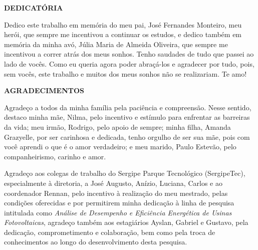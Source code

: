\cleardoublepage
\thispagestyle{empty}

\begin{center}

\textbf{DEDICATÓRIA}
    
\end{center}



\vspace*{\fill}

\hspace*{7cm}
\begin{minipage}{\dimexpr\textwidth-8.2cm\relax}
Dedico este trabalho em memória do meu pai, José Fernandes Monteiro, meu herói, que sempre me incentivou a continuar os estudos,
 e dedico também em memória da minha avó, Júlia Maria de Almeida Oliveira, que sempre me incentivou a correr atrás dos meus sonhos. Tenho saudades de tudo que passei ao lado de vocês. Como eu queria agora poder abraçá-los e agradecer por tudo, pois, sem vocês, este trabalho e muitos dos meus sonhos não se realizariam. Te amo! 
\end{minipage}



\cleardoublepage
\thispagestyle{empty}

\begin{center}

\textbf{AGRADECIMENTOS}
    
\end{center}

 Agradeço a todos da minha família pela paciência e compreensão. Nesse sentido, destaco minha mãe, Nilma, pelo incentivo e estímulo para enfrentar as barreiras da vida; meu irmão, Rodrigo, pelo apoio de sempre; minha filha, Amanda Grazyelle, por ser carinhosa e dedicada, tenho orgulho de ser sua mãe, pois com você aprendi o que é o amor verdadeiro; e meu marido, Paulo Estevão, pelo companheirismo, carinho e amor.

Agradeço aos colegas de trabalho do Sergipe Parque Tecnológico (SergipeTec), especialmente à diretoria, a José Augusto, Anízio, Luciana, Carlos e ao coordenador Rennan, pelo incentivo à realização do meu mestrado, pelas condições oferecidas e por permitirem minha dedicação à linha de pesquisa intitulada como \textit{Análise de Desempenho e Eficiência Energética de Usinas Fotovoltaicas}, agradeço também aos estagiários Ayslan, Gabriel e Gustavo, pela dedicação, comprometimento e colaboração, bem como pela troca de conhecimentos ao longo do desenvolvimento desta pesquisa.

